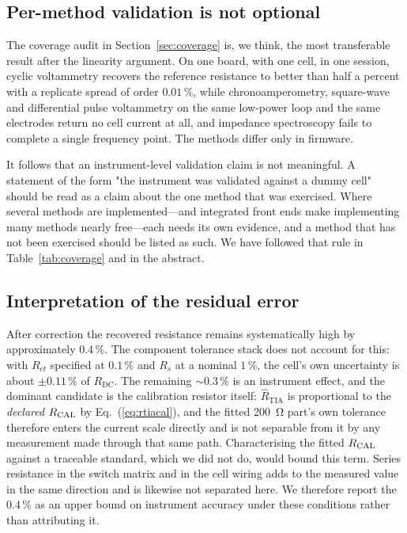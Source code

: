 \subsection{Per-method validation is not optional}
\label{sec:permethod}

The coverage audit in Section~\ref{sec:coverage} is, we think, the most
transferable result after the linearity argument. On one board, with one cell,
in one session, cyclic voltammetry recovers the reference resistance to better
than half a percent with a replicate spread of order $0.01\,\%$, while
chronoamperometry, square-wave and differential pulse voltammetry on the same
low-power loop and the same electrodes return no cell current at all, and
impedance spectroscopy fails to complete a single frequency point. The methods
differ only in firmware.

It follows that an instrument-level validation claim is not meaningful. A
statement of the form "the instrument was validated against a dummy cell"
should be read as a claim about the one method that was exercised. Where several
methods are implemented---and integrated front ends make implementing many
methods nearly free---each needs its own evidence, and a method that has not
been exercised should be listed as such. We have followed that rule in
Table~\ref{tab:coverage} and in the abstract.

\subsection{Interpretation of the residual error}
\label{sec:residual}

After correction the recovered resistance remains systematically high by
approximately $0.4\,\%$. The component tolerance stack does not account for
this: with $R_{ct}$ specified at $0.1\,\%$ and $R_s$ at a nominal $1\,\%$, the
cell's own uncertainty is about $\pm0.11\,\%$ of $R_{\mathrm{DC}}$. The
remaining $\sim\!0.3\,\%$ is an instrument effect, and the dominant candidate is
the calibration resistor itself: $\hat{R}_{\mathrm{TIA}}$ is proportional to the
\emph{declared} $R_{\mathrm{CAL}}$ by Eq.~(\ref{eq:rtiacal}), and the fitted
\SI{200}{\ohm} part's own tolerance therefore enters the current scale directly
and is not separable from it by any measurement made through that same path.
Characterising the fitted $R_{\mathrm{CAL}}$ against a traceable standard, which we did not
do, would bound this term. Series resistance in the switch matrix and in the
cell wiring adds to the measured value in the same direction and is likewise
not separated here. We therefore report the $0.4\,\%$ as an upper bound on
instrument accuracy under these conditions rather than attributing it.

